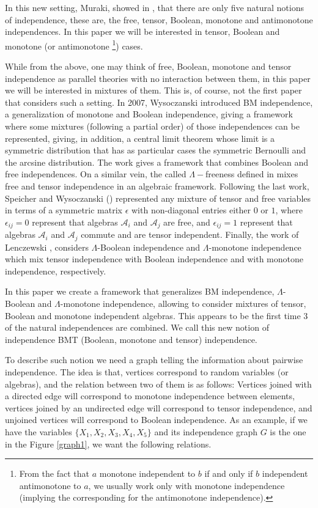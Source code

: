 \documentclass[a4paper,12pt]{extarticle}
\theoremstyle{definition}
\theoremstyle{remark}
\begin{document}
In this new setting, Muraki, showed in \cite{Muraki2003}, that there are only five natural notions of independence, these are, the free, tensor, Boolean, monotone and antimonotone independences. 
In this paper we will be interested in tensor, Boolean and monotone (or antimonotone \footnote{From the fact that $a$ monotone independent to $b$ if and only if $b$ independent antimonotone to $a$, we usually work only with monotone independence (implying the corresponding for the antimonotone independence).
}) cases.


While from the above, one may think of free, Boolean, monotone and tensor independence as parallel theories with no  interaction between them, in this paper we will be interested in mixtures of them. This is, of course, not the first paper that considers such a setting.  In 2007, Wysoczanski \cite{BM2007} introduced BM independence, a generalization of monotone and Boolean independence, giving a framework where some mixtures (following a partial order) of those independences can be represented, giving, in addition, a central limit theorem whose limit is a symmetric distribution that has as particular cases the symmetric Bernoulli and the arcsine distribution. The work \cite{BF2013} gives a framework that combines Boolean and free independences. On a similar vein, the called $\Lambda-$freeness defined in \cite{Lambda2004} mixes free and tensor independence in an algebraic framework. Following the last work, Speicher and Wysoczanski (\cite{eps2016}) represented any mixture of tensor and free variables in terms of a symmetric matrix $\epsilon$ with non-diagonal entries either $0$ or $1$, where $\epsilon_{ij}=0$ represent that algebras $\mathcal{A}_i$ and $\mathcal{A}_j$ are free, and $\epsilon_{ij}=1$ represent that algebras $\mathcal{A}_i$ and $\mathcal{A}_j$ commute and are tensor independent. Finally, the work of   Lenczewski \cite{Len1}, considers  $\Lambda$-Boolean independence and $\Lambda$-monotone independence which mix tensor independence with Boolean independence and with monotone independence, respectively.

In this paper we create a framework that generalizes BM independence, $\Lambda$-Boolean and $\Lambda$-monotone independence, allowing to consider mixtures of tensor, Boolean and monotone independent algebras. This appears to be the first time 3 of the natural independences are combined. We call this new notion of independence BMT (Boolean, monotone and tensor) independence.

To describe such notion we need a graph telling the information about pairwise independence. The idea is  that, vertices correspond to random variables (or algebras), and the relation between two of them is as follows: Vertices joined with a directed edge will correspond to monotone independence between elements, vertices joined by an undirected edge will correspond to tensor independence, and unjoined vertices will correspond to Boolean independence. 
As an example, if we have the variables $\{X_1,X_2,X_3,X_4,X_5\}$ and its independence graph $G$ is the one in the Figure \ref{graph1}, we want the following relations. 
\end{document}
